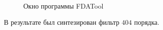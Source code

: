 \documentclass[a4paper,14pt]{article}
\begin{document}
\newpage
\begin{figure}[bh]
	\noindent{}
	\caption{Окно программы FDATool}
	\label{figCurves}
\end{figure}

\hspace{0,5cm}В результате был синтезирован фильтр $404$ порядка. 
\end{document}
